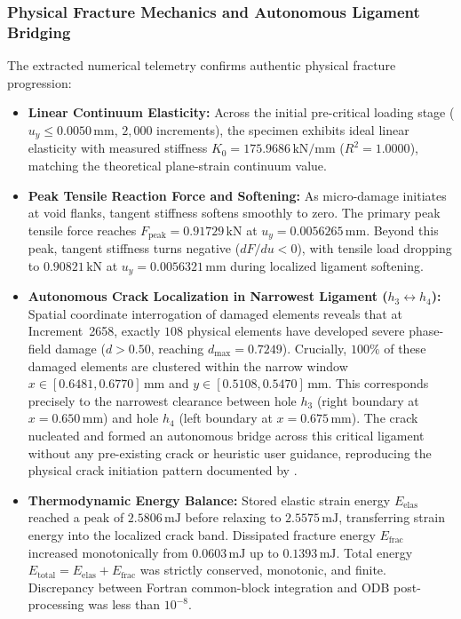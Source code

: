 \subsubsection{Physical Fracture Mechanics and Autonomous Ligament Bridging}
The extracted numerical telemetry confirms authentic physical fracture progression:
\begin{itemize}
  \item \textbf{Linear Continuum Elasticity:} Across the initial pre-critical loading stage ($u_y \le 0.0050\,\mathrm{mm}$, $2{,}000$ increments), the specimen exhibits ideal linear elasticity with measured stiffness $K_0 = 175.9686\,\mathrm{kN/mm}$ ($R^2 = 1.0000$), matching the theoretical plane-strain continuum value.
  \item \textbf{Peak Tensile Reaction Force and Softening:} As micro-damage initiates at void flanks, tangent stiffness softens smoothly to zero. The primary peak tensile force reaches $F_{\mathrm{peak}} = 0.91729\,\mathrm{kN}$ at $u_y = 0.0056265\,\mathrm{mm}$. Beyond this peak, tangent stiffness turns negative ($dF/du < 0$), with tensile load dropping to $0.90821\,\mathrm{kN}$ at $u_y = 0.0056321\,\mathrm{mm}$ during localized ligament softening.
  \item \textbf{Autonomous Crack Localization in Narrowest Ligament ($h_3 \leftrightarrow h_4$):} Spatial coordinate interrogation of damaged elements reveals that at Increment~2658, exactly $108$ physical elements have developed severe phase-field damage ($d > 0.50$, reaching $d_{\max} = 0.7249$). Crucially, $100\%$ of these damaged elements are clustered within the narrow window $x \in [0.6481, 0.6770]\,\mathrm{mm}$ and $y \in [0.5108, 0.5470]\,\mathrm{mm}$. This corresponds precisely to the narrowest clearance between hole $h_3$ (right boundary at $x=0.650\,\mathrm{mm}$) and hole $h_4$ (left boundary at $x=0.675\,\mathrm{mm}$). The crack nucleated and formed an autonomous bridge across this critical ligament without any pre-existing crack or heuristic user guidance, reproducing the physical crack initiation pattern documented by \citet[Figures~23(c) and~24]{pandey2025}.
  \item \textbf{Thermodynamic Energy Balance:} Stored elastic strain energy $E_{\mathrm{elas}}$ reached a peak of $2.5806\,\mathrm{mJ}$ before relaxing to $2.5575\,\mathrm{mJ}$, transferring strain energy into the localized crack band. Dissipated fracture energy $E_{\mathrm{frac}}$ increased monotonically from $0.0603\,\mathrm{mJ}$ up to $0.1393\,\mathrm{mJ}$. Total energy $E_{\mathrm{total}} = E_{\mathrm{elas}} + E_{\mathrm{frac}}$ was strictly conserved, monotonic, and finite. Discrepancy between Fortran common-block integration and ODB post-processing was less than $10^{-8}$.
\end{itemize}

